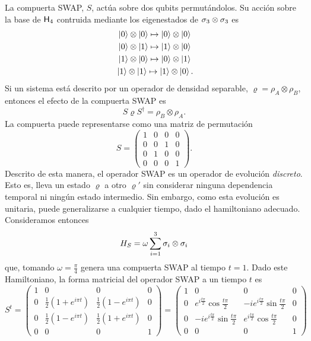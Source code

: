 La compuerta SWAP, $S$, actúa sobre dos qubits permutándolos. Su acción sobre la base de ${\sf H}_{4}$ contruida mediante los eigenestados de $\sigma_{3}\otimes\sigma_{3}$ es
\begin{align*}
    \ket{0}\otimes\ket{0}\mapsto\ket{0}\otimes\ket{0}\\
    \ket{0}\otimes\ket{1}\mapsto\ket{1}\otimes\ket{0}\\
    \ket{1}\otimes\ket{0}\mapsto\ket{0}\otimes\ket{1}\\
    \ket{1}\otimes\ket{1}\mapsto\ket{1}\otimes\ket{0} \rlap{.}
\end{align*}
Si un sistema está descrito por un operador de densidad separable, $\varrho=\rho_{A}\otimes\rho_{B}$, entonces el efecto de la compuerta SWAP es 
\begin{equation*}
    S\varrho S^{\dag}=\rho_{B}\otimes\rho_{A}.
\end{equation*}
La compuerta puede representarse como una matriz de permutación
\begin{equation*}
    S=\begin{pmatrix}
        1&0&0&0\\
        0&0&1&0\\
        0&1&0&0\\
        0&0&0&1
    \end{pmatrix}.
\end{equation*}
Descrito de esta manera, el operador SWAP es un operador de evolución \textit{discreto}. Esto es, lleva un estado $\varrho$ a otro $\varrho'$ sin considerar ninguna dependencia temporal ni ningún estado intermedio. Sin embargo, como esta evolución es unitaria, puede generalizarse a cualquier tiempo, dado el hamiltoniano adecuado. Consideramos entonces
\begin{equation*}
  H_{S}=\omega\sum_{i=1}^{3}\sigma_{i}\otimes\sigma_{i}
\end{equation*}
que, tomando $\omega=\frac{\pi}{4}$ genera una compuerta SWAP al tiempo $t=1$. Dado este Hamiltoniano, la forma matricial del operador \textsc{SWAP} a un tiempo $t$ es
\begin{equation}\label{eq:SWAP(t)}
S^{t}=\begin{pmatrix}
 1 & 0 & 0 & 0 \\
 0 & \frac{1}{2}(1+e^{i \pi t}) & \frac{1}{2} (1-e^{i \pi t}) & 0 \\
 0 & \frac{1}{2}(1-e^{i \pi t}) & \frac{1}{2}(1+e^{i \pi t}) & 0 \\
 0 & 0 & 0 & 1
\end{pmatrix}=\begin{pmatrix}
  1 & 0 & 0 & 0 \\
  0 & e^{i\frac{t\pi}{2}}\cos{\frac{t\pi}{2}} & -ie^{i\frac{t\pi}{2}}\sin{\frac{t\pi}{2}} & 0 \\
  0 & -ie^{i\frac{t\pi}{2}}\sin{\frac{t\pi}{2}} & e^{i\frac{t\pi}{2}}\cos{\frac{t\pi}{2}}  & 0 \\
  0 & 0 & 0 & 1
 \end{pmatrix}
\end{equation}

